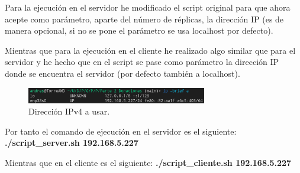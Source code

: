\documentclass{article}
\begin{document}
Para la ejecución en el servidor he modificado el script original para que ahora acepte como parámetro, aparte del número de réplicas, la dirección IP (es de manera opcional, si no se pone el parámetro se usa localhost por defecto).

Mientras que para la ejecución en el cliente he realizado algo similar que para el servidor y he hecho que en el script se pase como parámetro la dirección IP donde se encuentra el servidor (por defecto también a localhost).

\begin{figure}[H]
    \centering
    \includegraphics[width=0.7\textwidth]{imagenes/multiples ordenadores/IP.png}
    \caption{Dirección IPv4 a usar.}
\end{figure}

Por tanto el comando de ejecución en el servidor es el siguiente: \textbf{./script\_server.sh 192.168.5.227}

Mientras que en el cliente es el siguiente: \textbf{./script\_cliente.sh 192.168.5.227}
\end{document}
